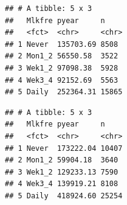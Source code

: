 \documentclass[]{article}
\newenvironment{Shaded}{\begin{snugshade}}{\end{snugshade}}
\newcommand{\CommentTok}[1]{\textcolor[rgb]{0.56,0.35,0.01}{\textit{#1}}}
\newcommand{\DataTypeTok}[1]{\textcolor[rgb]{0.13,0.29,0.53}{#1}}
\newcommand{\DecValTok}[1]{\textcolor[rgb]{0.00,0.00,0.81}{#1}}
\newcommand{\KeywordTok}[1]{\textcolor[rgb]{0.13,0.29,0.53}{\textbf{#1}}}
\newcommand{\NormalTok}[1]{#1}
\newcommand{\OperatorTok}[1]{\textcolor[rgb]{0.81,0.36,0.00}{\textbf{#1}}}
\newcommand{\OtherTok}[1]{\textcolor[rgb]{0.56,0.35,0.01}{#1}}
\newcommand{\StringTok}[1]{\textcolor[rgb]{0.31,0.60,0.02}{#1}}
\begin{document}
\begin{Shaded}
\end{Shaded}

\begin{verbatim}
## # A tibble: 5 x 3
##   Mlkfre pyear     n    
##   <fct>  <chr>     <chr>
## 1 Never  135703.69 8508 
## 2 Mon1_2 56550.58  3522 
## 3 Wek1_2 97098.38  5928 
## 4 Wek3_4 92152.69  5563 
## 5 Daily  252364.31 15865
\end{verbatim}

\begin{Shaded}
\end{Shaded}

\begin{verbatim}
## # A tibble: 5 x 3
##   Mlkfre pyear     n    
##   <fct>  <chr>     <chr>
## 1 Never  173222.04 10407
## 2 Mon1_2 59904.18  3640 
## 3 Wek1_2 129233.13 7590 
## 4 Wek3_4 139919.21 8108 
## 5 Daily  418924.60 25254
\end{verbatim}

\begin{Shaded}
\end{Shaded}
\end{document}
